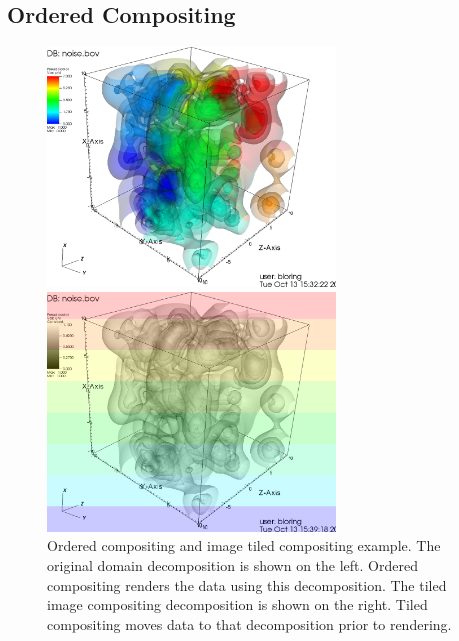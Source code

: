 \documentclass[a4paper,10pt]{report}
\begin{document}
\subsection*{Ordered Compositing}
\begin{figure}
\centering
\begin{minipage}{0.48\textwidth}
\begin{center}
\includegraphics[height=2.5in]{./order_composite_example_color.png}
\end{center}
\end{minipage}
\begin{minipage}{0.48\textwidth}
\begin{center}
\includegraphics[height=2.5in]{./tiled_image_example_color.png}
\end{center}
\end{minipage}
\begin{minipage}{0.55\textwidth} 
\caption{\footnotesize Ordered compositing and image tiled compositing example. The original domain decomposition is shown on the left. Ordered compositing renders the data using this decomposition. The tiled image compositing decomposition is shown on the right. Tiled compositing moves data to that decomposition prior to rendering.}
\label{fig:example}
\end{minipage}\hspace{0.04in}

\end{figure}
\end{document}
